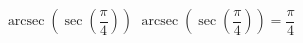  {$\operatorname{arcsec}\left(\sec\left(\dfrac{\pi}{4}\right) \right)$  }
{ $\operatorname{arcsec}\left(\sec\left(\dfrac{\pi}{4}\right) \right) = \dfrac{\pi}{4}$ }
